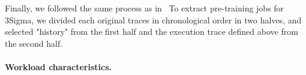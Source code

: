 
Finally, we followed the same process as in~\cite{3Sigma}
To extract pre-training jobs for 3Sigma,
we divided each original traces in chronological
order in two halves, and selected "history" from the first
half and the execution trace defined above from the second half.

\paragraph{Workload characteristics.}
